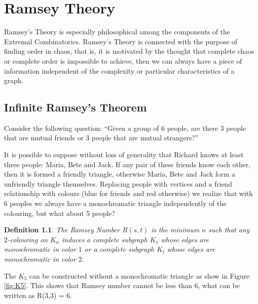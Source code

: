 \documentclass[12pt,twoside,a4paper]{book}
\numberwithin{equation}{section}
\newtheorem{definition}	[theorem] {Definition}
\theoremstyle{remark}
\begin{document}



\chapter{Ramsey Theory}

Ramsey's Theory is especially philosophical among the components of the Extremal Combinatorics. Ramsey's Theory is connected with the purpose of finding order in chaos, that is, it is motivated by the thought that complete chaos or complete order is impossible to achieve, then we can always have a piece of information independent of the complexity or particular characteristics of a graph.

\section{Infinite Ramsey's Theorem}
Consider the following question:
``Given a group of 6 people, are there 3 people that are mutual friends or 3 people that are mutual strangers?''

It is possible to suppose without loss of generality that Richard knows at least three people: Maria, Bete and Jack. If any pair of these friends know each other, then it is formed a friendly triangle, otherwise Maria, Bete and Jack form a unfriendly triangle themselves. Replacing people with vertices and a friend relationship with colours (blue for friends and red otherwise) we realize that with 6 peoples we always have a monochromatic triangle independently of the colouring, but what about 5 people?

\begin{definition}\label{def:RamseyNumbers} 
The Ramsey Number $R(s,t)$ is the minimum $n$ such that any $2$-colouring on $K_n$ induces a complete subgraph $K_s$ whose edges are monochromatic in color $1$ or a complete subgraph $K_t$ whose edges are monochromatic in color $2$.
\end{definition}

The $K_5$ can be constructed without a monochromatic triangle as show in Figure \ref{fig:K5}. This shows that Ramsey number cannot be less than 6, what can be written as  R(3,3) = 6.
\end{document}
